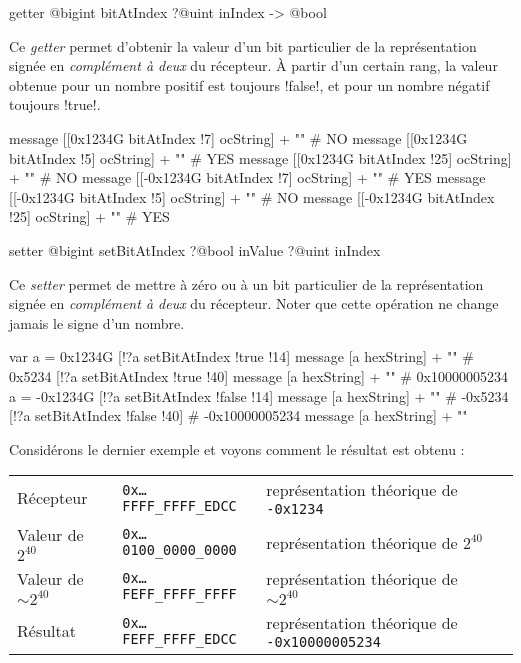 \begin{galgas}
getter @bigint bitAtIndex ?@uint inIndex -> @bool
\end{galgas}

Ce \emph{getter} permet d'obtenir la valeur d'un bit particulier de la représentation signée en \emph{complément à deux} du récepteur. À partir d'un certain rang, la valeur obtenue pour un nombre positif est toujours \ggs!false!, et pour un nombre négatif toujours \ggs!true!.

\begin{galgas}
message [[0x1234G bitAtIndex !7] ocString] + "\n" # NO
message [[0x1234G bitAtIndex !5] ocString] + "\n" # YES
message [[0x1234G bitAtIndex !25] ocString] + "\n" # NO
message [[-0x1234G bitAtIndex !7] ocString] + "\n" # YES
message [[-0x1234G bitAtIndex !5] ocString] + "\n" # NO
message [[-0x1234G bitAtIndex !25] ocString] + "\n" # YES
\end{galgas}


\begin{galgas}
setter @bigint setBitAtIndex ?@bool inValue ?@uint inIndex
\end{galgas}

Ce \emph{setter} permet de mettre à zéro ou à un bit particulier de la représentation signée en \emph{complément à deux} du récepteur. Noter que cette opération ne change jamais le signe d'un nombre.

\begin{galgas}
var a = 0x1234G
[!?a setBitAtIndex !true !14]
message [a hexString] + "\n" # 0x5234
[!?a setBitAtIndex !true !40]
message [a hexString] + "\n" # 0x10000005234
a = -0x1234G
[!?a setBitAtIndex !false !14]
message [a hexString] + "\n" # -0x5234
[!?a setBitAtIndex !false !40] # -0x10000005234
message [a hexString] + "\n"
\end{galgas}

Considérons le dernier exemple et voyons comment le résultat est obtenu :

\begin{tabular}{llll}
Récepteur & \texttt{0x…FFFF\_FFFF\_EDCC} & représentation théorique de \texttt{-0x1234}\\
Valeur de $2^{40}$ & \texttt{0x…0100\_0000\_0000} & représentation théorique de $2^{40}$ \\
Valeur de $\sim2^{40}$ & \texttt{0x…FEFF\_FFFF\_FFFF} & représentation théorique de $\sim2^{40}$ \\
Résultat & \texttt{0x…FEFF\_FFFF\_EDCC} & représentation théorique de \texttt{-0x10000005234} \\
\end{tabular}


